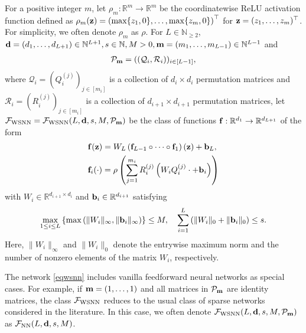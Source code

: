 \documentclass[twoside,11pt]{article}
\def\cF{\mathcal F}
\def\cP{\mathcal P}
\def\cQ{\mathcal Q}
\def\cR{\mathcal R}
\newcommand{\bb}{{\bf b}}
\newcommand{\bd}{{\bf d}}
\newcommand{\bff}{{\bf f}}
\newcommand{\bfm}{{\bf m}}
\newcommand{\bz}{{\bf z}}
\newcommand{\bbR}{{\mathbb R}}
\newcommand{\bbN}{{\mathbb N}}
\newcommand{\be}{\begin{equation}}
\newcommand{\ee}{\end{equation}}
\newcommand{\bean}{\setlength\arraycolsep{1pt}\begin{eqnarray*}}
\newcommand{\eean}{\end{eqnarray*}}
\begin{document}
For a positive integer $m$, let $\rho_{m} : \bbR^{m} \to \bbR^{m}$ be the coordinatewise ReLU activation function defined as $\rho_{m}(\bz) = \left(\max\{z_1,0\}, \ldots, \max\{z_m, 0\} \right)^{{\top}}$ for $\bz = (z_1,\ldots,z_m)^{\top}$.
For simplicity, we often denote $\rho_{m}$ as $\rho$.
For $L \in \bbN_{\geq 2}$, $\bd = (d_1,\ldots,d_{L+1}) \in  \bbN^{L+1}, s \in \bbN, M > 0, \bfm = (m_1,\ldots,m_{L-1}) \in \bbN^{L-1}$ and 
\bean
\cP_{\bfm} = ( ( \cQ_{i}, \cR_{i} ) )_{i \in [L-1]},
\eean
where $\cQ_i = ( Q_i^{(j)})_{j \in [m_i]} $ is a collection of $d_{i} \times d_{i}$ permutation matrices  and $\cR_i = ( R_i^{(j)} )_{j \in [m_i]} $ is a collection of $d_{i+1} \times d_{i+1}$ permutation matrices, let $\cF_{\rm WSNN} = \cF_{\rm WSNN} (L,\bd,s,M,\cP_{\bfm})$ be the class of functions $\bff: \bbR^{d_1} \to \bbR^{d_{L+1}}$ of the form
\be \begin{split}
& \bff(\bz) = W_{L} \left( \bff_{L-1} \circ \cdots \circ \bff_{1} \right) (\bz) + \bb_{L},
\\ 
& \bff_i(\cdot) = \rho \left( \sum_{j=1}^{m_i} R_{i}^{(j)} \left(W_i  Q_{i}^{(j)} \cdot + \bb_{i} \right) \right) \label{eqwsnn}
\end{split} \ee
with $W_i \in \bbR^{d_{i+1} \times d_{i}}$ and $\bb_{i} \in \bbR^{d_{i+1}}$ satisfying
\bean
\max_{1 \leq i \leq L}\left\{ \max \left(\|W_i\|_{\infty} , \| \bb_i\|_{\infty} \right) \right\} \leq M, \quad \sum_{i=1}^{L} \left( \|W_i\|_0 + \| \bb_i\|_0 \right) \leq s.
\eean
Here, $\|W_i\|_\infty$ and $\| W_i\|_0$ denote the entrywise maximum norm and the number of nonzero elements of the matrix $W_i$, respectively.

The network \eqref{eqwsnn} includes vanilla feedforward neural networks as special cases. For example, if $\bfm = (1, \ldots, 1)$ and all matrices in $\cP_{\bfm}$ are identity matrices, the class $\cF_{\rm WSNN}$ reduces to the usual class of sparse networks considered in the literature. In this case, we often denote $\cF_{\rm WSNN}(L, \bd, s, M, \cP_{\bfm})$ as $\cF_{\rm NN}(L, \bd, s, M)$.
\end{document}
